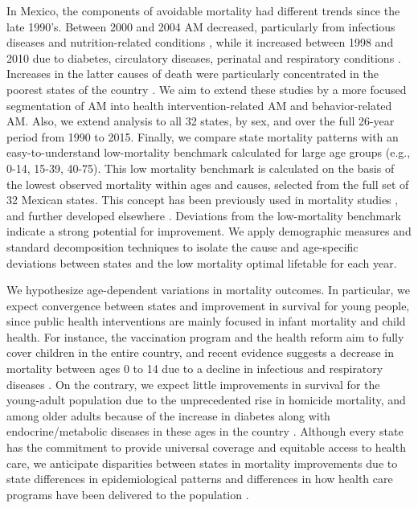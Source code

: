 \documentclass{bmcart}
\begin{document}
 In Mexico, the components of avoidable mortality had different trends since the
late 1990's. Between 2000 and 2004 AM decreased, particularly from
infectious diseases and nutrition-related conditions \cite{francomarina2006}, while it increased between 1998 and 2010 due to diabetes, circulatory diseases, perinatal and respiratory conditions
\cite{agudelo2014efecto}. Increases in the latter causes
of death were particularly concentrated in the poorest states of the country
\cite{davila2014mortalidad}. We aim to extend these studies
by a more focused segmentation of AM into health intervention-related AM and
behavior-related AM. Also, we extend analysis to all 32 states, by sex, and over
the full 26-year period from 1990 to 2015. Finally, we compare state mortality patterns
with an easy-to-understand low-mortality benchmark calculated for large age groups (e.g., 0-14, 15-39, 40-75). This low mortality
benchmark is calculated on the basis of the lowest observed mortality within
ages and causes, selected from the full set of 32 Mexican states. This concept has been previously used in mortality studies \cite{whelpton1947}, and further developed elsewhere 
\cite{wunsch1975minimum,vallin2008minimum}. Deviations from the low-mortality benchmark indicate a strong potential for improvement. We apply demographic measures and
standard decomposition techniques to isolate the cause and age-specific deviations between states and the low mortality optimal lifetable for each year.

We hypothesize age-dependent variations in mortality outcomes.
In particular, we expect convergence between states and improvement in survival
for young people, since public health interventions are mainly focused in infant
mortality and child health. For instance, the vaccination program and the health
reform aim to fully cover children in the entire country, and recent
evidence suggests a decrease in mortality between ages 0 to 14 due to a decline
in infectious and respiratory diseases \cite{gonzalez2016mexico}. On the contrary, we
expect little improvements in survival for the  young-adult population due to the unprecedented rise in homicide mortality, and among older adults because of the increase in diabetes along with endocrine/metabolic diseases in these ages in the country \cite{gonzalez2011health,gonzalez2016mexico}. Although every
state has the commitment to provide universal coverage and equitable access to
health care, we anticipate disparities between states
in mortality improvements due to state differences in epidemiological patterns  \cite{gomez2016dissonant} and differences in how  health care programs have been delivered to the population
\cite{Frenk2006}.
\end{document}
